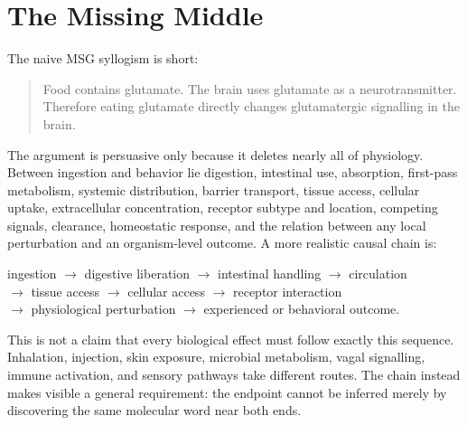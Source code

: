 \documentclass[11pt]{article}
\begin{document}
\section{The Missing Middle}

The naive MSG syllogism is short:

\begin{quote}
Food contains glutamate. The brain uses glutamate as a neurotransmitter. Therefore eating glutamate directly changes glutamatergic signalling in the brain.
\end{quote}

The argument is persuasive only because it deletes nearly all of physiology. Between ingestion and behavior lie digestion, intestinal use, absorption, first-pass metabolism, systemic distribution, barrier transport, tissue access, cellular uptake, extracellular concentration, receptor subtype and location, competing signals, clearance, homeostatic response, and the relation between any local perturbation and an organism-level outcome. A more realistic causal chain is:

\begin{center}
ingestion $\rightarrow$ digestive liberation $\rightarrow$ intestinal handling $\rightarrow$ circulation\\
$\rightarrow$ tissue access $\rightarrow$ cellular access $\rightarrow$ receptor interaction\\
$\rightarrow$ physiological perturbation $\rightarrow$ experienced or behavioral outcome.
\end{center}

This is not a claim that every biological effect must follow exactly this sequence. Inhalation, injection, skin exposure, microbial metabolism, vagal signalling, immune activation, and sensory pathways take different routes. The chain instead makes visible a general requirement: the endpoint cannot be inferred merely by discovering the same molecular word near both ends.
\end{document}
